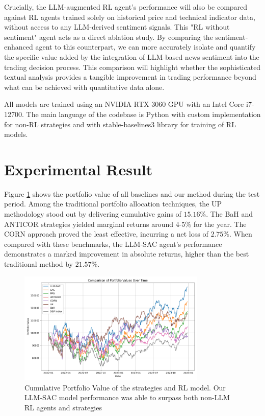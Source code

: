 Crucially, the \gls{LLM}-augmented \gls{RL} agent's performance will also be compared against RL agents trained solely on historical price and technical indicator data, without access to any \gls{LLM}-derived sentiment signals. This "RL without sentiment" agent acts as a direct ablation study. By comparing the sentiment-enhanced agent to this counterpart, we can more accurately isolate and quantify the specific value added by the integration of \gls{LLM}-based news sentiment into the trading decision process. This comparison will highlight whether the sophisticated textual analysis provides a tangible improvement in trading performance beyond what can be achieved with quantitative data alone.

All models are trained using an NVIDIA RTX 3060 GPU with an Intel Core i7-12700. The main language of the codebase is Python with custom implementation for non-\gls{RL} strategies and with stable-baselines3 library for training of \gls{RL} models.

\section{Experimental Result}
Figure \ref{fig:portfolio_value} shows the portfolio value of all baselines and our method during the test period. Among the traditional portfolio allocation techniques, the \gls{UP} methodology stood out by delivering cumulative gains of \(15.16\%\). The \gls{BaH} and \gls{ANTICOR} strategies yielded marginal returns around \(4\)-\(5\%\) for the year. The CORN approach proved the least effective, incurring a net loss of \(2.75\%\). When compared with these benchmarks, the LLM‑SAC agent’s performance demonstrates a marked improvement in absolute returns, higher than the best traditional method by \(21.57\%\).

\begin{figure}
  \centering
  \includegraphics[width=0.8\textwidth]{images/CPV_plot.png}
  \caption{Cumulative Portfolio Value of the strategies and RL model. Our LLM-SAC model performance was able to surpass both non-LLM RL agents and strategies}
  \label{fig:portfolio_value}
\end{figure}

